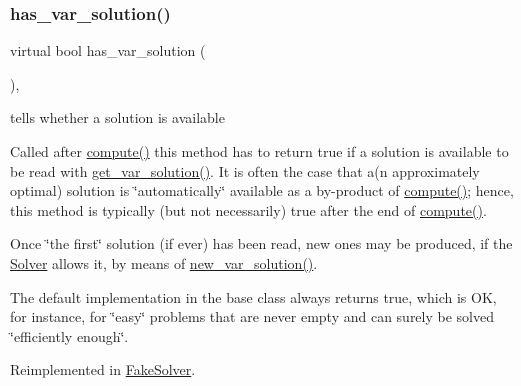 \subsubsection{\texorpdfstring{has\+\_\+var\+\_\+solution()}{has\_var\_solution()}}
{\footnotesize\ttfamily virtual bool has\+\_\+var\+\_\+solution (\begin{DoxyParamCaption}\item[{void}]{ }\end{DoxyParamCaption})\hspace{0.3cm}{\ttfamily [inline]}, {\ttfamily [virtual]}}



tells whether a solution is available 

Called after \mbox{\hyperlink{class_s_m_spp__di__unipi__it_1_1_solver_a504d4e3e174c7a518cc66156a8a45ce5}{compute()}} this method has to return true if a solution is available to be read with \mbox{\hyperlink{class_s_m_spp__di__unipi__it_1_1_solver_a91d7cd0dc4fa453406ef30db2bfa37a5}{get\+\_\+var\+\_\+solution()}}. It is often the case that a(n approximately optimal) solution is \char`\"{}automatically\char`\"{} available as a by-\/product of \mbox{\hyperlink{class_s_m_spp__di__unipi__it_1_1_solver_a504d4e3e174c7a518cc66156a8a45ce5}{compute()}}; hence, this method is typically (but not necessarily) true after the end of \mbox{\hyperlink{class_s_m_spp__di__unipi__it_1_1_solver_a504d4e3e174c7a518cc66156a8a45ce5}{compute()}}.

Once \char`\"{}the first\char`\"{} solution (if ever) has been read, new ones may be produced, if the \mbox{\hyperlink{class_s_m_spp__di__unipi__it_1_1_solver}{Solver}} allows it, by means of \mbox{\hyperlink{class_s_m_spp__di__unipi__it_1_1_solver_af109b504a566c90a4ea45c1574c128fe}{new\+\_\+var\+\_\+solution()}}.

The default implementation in the base class always returns true, which is OK, for instance, for \char`\"{}easy\char`\"{} problems that are never empty and can surely be solved \char`\"{}efficiently enough\char`\"{}. 

Reimplemented in \mbox{\hyperlink{class_s_m_spp__di__unipi__it_1_1_fake_solver_ade6d8078e2b6708ea0fa989629de2419}{Fake\+Solver}}.

\mbox{\label{class_s_m_spp__di__unipi__it_1_1_solver_a61e973f39747f63b8f56d97cc62e32ce}} 

